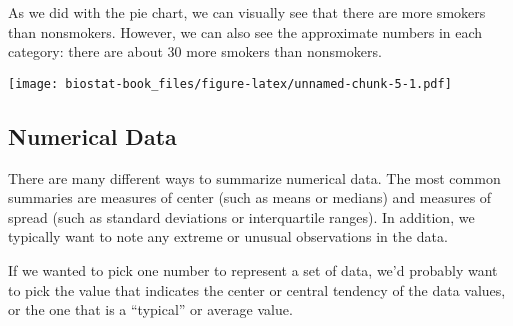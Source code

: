 \documentclass[
]{book}
\newenvironment{Shaded}{\begin{snugshade}}{\end{snugshade}}
\newcommand{\AttributeTok}[1]{\textcolor[rgb]{0.77,0.63,0.00}{#1}}
\newcommand{\DecValTok}[1]{\textcolor[rgb]{0.00,0.00,0.81}{#1}}
\newcommand{\ErrorTok}[1]{\textcolor[rgb]{0.64,0.00,0.00}{\textbf{#1}}}
\newcommand{\FunctionTok}[1]{\textcolor[rgb]{0.00,0.00,0.00}{#1}}
\newcommand{\NormalTok}[1]{#1}
\newcommand{\OtherTok}[1]{\textcolor[rgb]{0.56,0.35,0.01}{#1}}
\newcommand{\SpecialCharTok}[1]{\textcolor[rgb]{0.00,0.00,0.00}{#1}}
\newcommand{\StringTok}[1]{\textcolor[rgb]{0.31,0.60,0.02}{#1}}
\begin{document}
As we did with the pie chart, we can visually see that there are more smokers than nonsmokers. However, we can also see the approximate numbers in each category: there are about 30 more smokers than nonsmokers.

\begin{Shaded}
\end{Shaded}

\texttt{[image: biostat-book\_files/figure-latex/unnamed-chunk-5-1.pdf]}

\hypertarget{numerical-data}{%
\subsection{Numerical Data}\label{numerical-data}}

There are many different ways to summarize numerical data. The most common summaries are measures of center (such as means or medians) and measures of spread (such as standard deviations or interquartile ranges). In addition, we typically want to note any extreme or unusual observations in the data.

If we wanted to pick one number to represent a set of data, we'd probably want to pick the value that indicates the center or central tendency of the data values, or the one that is a ``typical'' or average value.
\end{document}
